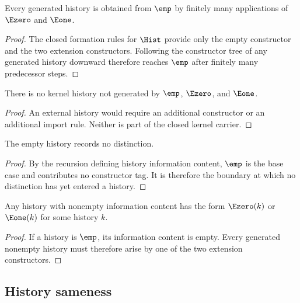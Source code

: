 \begin{theorem}
\label{thm:philosophy-histories-finitely-generated}
Every generated history is obtained from \(\emp\) by finitely many
applications of \(\Ezero\) and \(\Eone\).
\end{theorem}
\begin{proof}
The closed formation rules for \(\Hist\) provide only the empty
constructor and the two extension constructors. Following the
constructor tree of any generated history downward therefore reaches
\(\emp\) after finitely many predecessor steps.
\end{proof}

\begin{corollary}
\label{cor:philosophy-no-external-history-kernel}
There is no kernel history not generated by \(\emp\), \(\Ezero\), and
\(\Eone\).
\end{corollary}
\begin{proof}
An external history would require an additional constructor or an
additional import rule. Neither is part of the closed kernel carrier.
\end{proof}

\begin{theorem}
\label{thm:philosophy-empty-history-zero-information-boundary}
The empty history records no distinction.
\end{theorem}
\begin{proof}
By the recursion defining history information content, \(\emp\) is the
base case and contributes no constructor tag. It is therefore the
boundary at which no distinction has yet entered a history.
\end{proof}

\begin{corollary}
\label{cor:philosophy-nontrivial-information-requires-extension}
Any history with nonempty information content has the form
\(\Ezero(k)\) or \(\Eone(k)\) for some history \(k\).
\end{corollary}
\begin{proof}
If a history is \(\emp\), its information content is empty. Every
generated nonempty history must therefore arise by one of the two
extension constructors.
\end{proof}

\subsection{History sameness}
\label{subsec:history-sameness}

